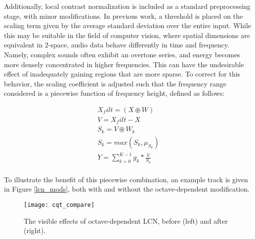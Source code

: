 Additionally, local contrast normalization is included as a standard preprocessing stage, with minor modifications.
In previous work, a threshold is placed on the scaling term given by the average standard deviation over the entire input.
While this may be suitable in the field of computer vision, where spatial dimensions are equivalent in 2-space, audio data behave differently in time and frequency.
Namely, complex sounds often exhibit an overtone series, and energy becomes more densely concentrated in higher frequencies.
This can have the undesirable effect of inadequately gaining regions that are more sparse.
To correct for this behavior, the scaling coefficient is adjusted such that the frequency range considered is a piecewise function of frequency height, defined as follows:

\begin{align*}
X_filt = (X \circledast W) \\
V = X_filt - X \\
S_k = V \circledast W_k \\
S_k = max(S_k, \mu_{S_k}) \\
Y = \sum_{k=0}^{K-1} g_k * \frac{V}{S_k} \\
\end{align*}

\noindent To illustrate the benefit of this piecewise combination, an example track is given in Figure \ref{lcn_mods}, both with and without the octave-dependent modification.

\begin{figure}[!t]
\centering
\texttt{[image: cqt\_compare]}
\caption{The visible effects of octave-dependent LCN, before (left) and after (right).}
\label{fig:lcn_mods}
\end{figure}


